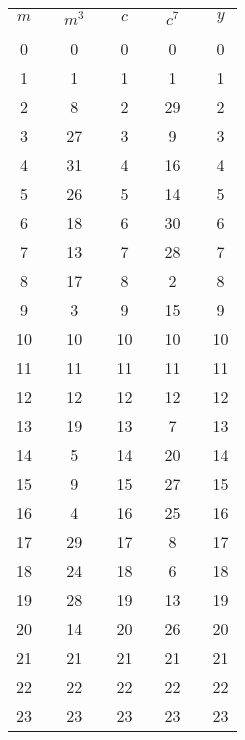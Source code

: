 \begin{footnotesize}
\begin{tabular}{ccccccccc}
   $m$  & & $m^3$ & \phantom{XXXXX} & 
   $c$  & & $c^7$ & \phantom{XXXXX} & $y$  \\
        & &       & &       & &       & &       \\
    0   & &   0   & &   0   & &   0   & &   0   \\
    1   & &   1   & &   1   & &   1   & &   1   \\
    2   & &   8   & &   2   & &  29   & &   2   \\
    3   & &  27   & &   3   & &   9   & &   3   \\
    4   & &  31   & &   4   & &  16   & &   4   \\
    5   & &  26   & &   5   & &  14   & &   5   \\
    6   & &  18   & &   6   & &  30   & &   6   \\
    7   & &  13   & &   7   & &  28   & &   7   \\
    8   & &  17   & &   8   & &   2   & &   8   \\
    9   & &   3   & &   9   & &  15   & &   9   \\
   10   & &  10   & &  10   & &  10   & &  10   \\
   11   & &  11   & &  11   & &  11   & &  11   \\
   12   & &  12   & &  12   & &  12   & &  12   \\
   13   & &  19   & &  13   & &   7   & &  13   \\
   14   & &   5   & &  14   & &  20   & &  14   \\
   15   & &   9   & &  15   & &  27   & &  15   \\
   16   & &   4   & &  16   & &  25   & &  16   \\
   17   & &  29   & &  17   & &   8   & &  17   \\
   18   & &  24   & &  18   & &   6   & &  18   \\
   19   & &  28   & &  19   & &  13   & &  19   \\
   20   & &  14   & &  20   & &  26   & &  20   \\
   21   & &  21   & &  21   & &  21   & &  21   \\
   22   & &  22   & &  22   & &  22   & &  22   \\
   23   & &  23   & &  23   & &  23   & &  23   \\

\end{tabular}
\end{footnotesize}
